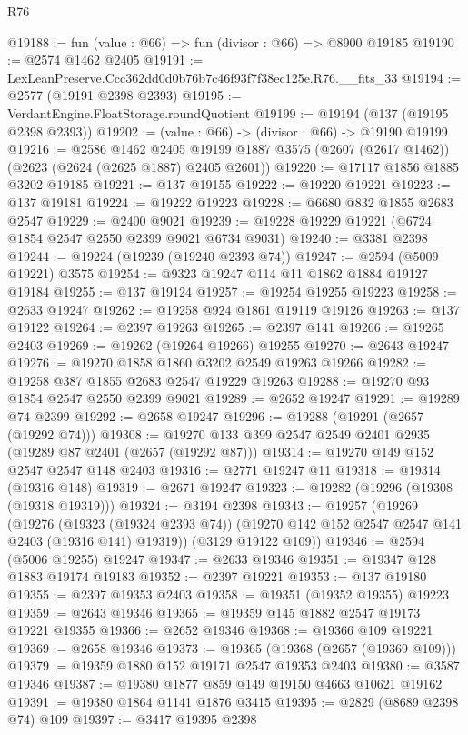 \begin{lexlean}{R76}
\begin{coremodule}
@19188 := fun (value : @66) => fun (divisor : @66) => @8900 @19185
@19190 := @2574 @1462 @2405
@19191 := LexLeanPreserve.Ccc362dd0d0b76b7c46f93f7f38ec125e.R76.__fits_33
@19194 := @2577 (@19191 @2398 @2393)
@19195 := VerdantEngine.FloatStorage.roundQuotient
@19199 := @19194 (@137 (@19195 @2398 @2393))
@19202 := (value : @66) -> (divisor : @66) -> @19190 @19199
@19216 := @2586
    @1462
    @2405
    @19199
    @1887
    @3575
    (@2607 (@2617 @1462))
    (@2623 (@2624 (@2625 @1887) @2405 @2601))
@19220 := @17117 @1856 @1885 @3202 @19185
@19221 := @137 @19155
@19222 := @19220 @19221
@19223 := @137 @19181
@19224 := @19222 @19223
@19228 := @6680 @832 @1855 @2683 @2547
@19229 := @2400 @9021
@19239 := @19228 @19229 @19221 (@6724 @1854 @2547 @2550 @2399 @9021 @6734 @9031)
@19240 := @3381 @2398
@19244 := @19224 (@19239 (@19240 @2393 @74))
@19247 := @2594 (@5009 @19221) @3575
@19254 := @9323 @19247 @114 @11 @1862 @1884 @19127 @19184
@19255 := @137 @19124
@19257 := @19254 @19255 @19223
@19258 := @2633 @19247
@19262 := @19258 @924 @1861 @19119 @19126
@19263 := @137 @19122
@19264 := @2397 @19263
@19265 := @2397 @141
@19266 := @19265 @2403
@19269 := @19262 (@19264 @19266) @19255
@19270 := @2643 @19247
@19276 := @19270 @1858 @1860 @3202 @2549 @19263 @19266
@19282 := @19258 @387 @1855 @2683 @2547 @19229 @19263
@19288 := @19270 @93 @1854 @2547 @2550 @2399 @9021
@19289 := @2652 @19247
@19291 := @19289 @74 @2399
@19292 := @2658 @19247
@19296 := @19288 (@19291 (@2657 (@19292 @74)))
@19308 := @19270 @133 @399 @2547 @2549 @2401 @2935 (@19289 @87 @2401 (@2657 (@19292 @87)))
@19314 := @19270 @149 @152 @2547 @2547 @148 @2403
@19316 := @2771 @19247 @11
@19318 := @19314 (@19316 @148)
@19319 := @2671 @19247
@19323 := @19282 (@19296 (@19308 (@19318 @19319)))
@19324 := @3194 @2398
@19343 := @19257
    (@19269
      (@19276
        (@19323 (@19324 @2393 @74))
        (@19270 @142 @152 @2547 @2547 @141 @2403 (@19316 @141) @19319))
      (@3129 @19122 @109))
@19346 := @2594 (@5006 @19255) @19247
@19347 := @2633 @19346
@19351 := @19347 @128 @1883 @19174 @19183
@19352 := @2397 @19221
@19353 := @137 @19180
@19355 := @2397 @19353 @2403
@19358 := @19351 (@19352 @19355) @19223
@19359 := @2643 @19346
@19365 := @19359 @145 @1882 @2547 @19173 @19221 @19355
@19366 := @2652 @19346
@19368 := @19366 @109 @19221
@19369 := @2658 @19346
@19373 := @19365 (@19368 (@2657 (@19369 @109)))
@19379 := @19359 @1880 @152 @19171 @2547 @19353 @2403
@19380 := @3587 @19346
@19387 := @19380 @1877 @859 @149 @19150 @4663 @10621 @19162
@19391 := @19380 @1864 @1141 @1876 @3415
@19395 := @2829 (@8689 @2398 @74) @109
@19397 := @3417 @19395 @2398

\end{coremodule}
\end{lexlean}
